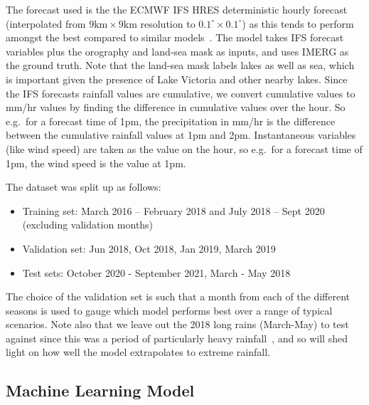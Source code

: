 \documentclass{article}
\begin{document}
The forecast used is the the ECMWF IFS HRES deterministic hourly forecast~\citep{ecmwf_operational_2023} (interpolated from $9\text{km} \times 9\text{km}$ resolution to $0.1^{\circ} \times 0.1^{\circ}$) as this tends to perform amongst the best compared to similar models~\citep{haiden_intercomparison_2012}. The model takes IFS forecast variables plus the orography and land-sea mask as inputs, and uses IMERG as the ground truth. Note that the land-sea mask labels lakes as well as sea, which is important given the presence of Lake Victoria and other nearby lakes. Since the IFS forecasts rainfall values are cumulative, we convert cumulative values to mm/hr values by finding the difference in cumulative values over the hour. So e.g.~for a forecast time of 1pm, the precipitation in mm/hr is the difference between the cumulative rainfall values at 1pm and 2pm. Instantaneous variables (like wind speed) are taken as the value on the hour, so e.g.~for a forecast time of 1pm, the wind speed is the value at 1pm. 

The dataset was split up as follows:
\begin{itemize}
    \item Training set: March 2016 – February 2018 and July 2018 – Sept 2020 (excluding validation months)
    \item Validation set: Jun 2018, Oct 2018, Jan 2019, March 2019
    \item Test sets: October 2020 - September 2021, March - May 2018
\end{itemize}
The choice of the validation set is such that a month from each of the different seasons is used to gauge which model performs best over a range of typical scenarios. Note also that we leave out the 2018 long rains (March-May) to test against since this was a period of particularly heavy rainfall~\citep{kilavi_extreme_2018}, and so will shed light on how well the model extrapolates to extreme rainfall. 

\subsection{Machine Learning Model}
\end{document}
